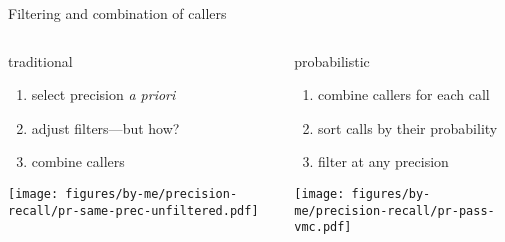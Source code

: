 \documentclass{beamer}
\begin{document}
\begin{frame}{Filtering and combination of callers}
\begin{columns}[b]
\begin{column}{0.5\textwidth}
\begin{center}
{\large traditional}

{\footnotesize
\begin{enumerate}
\item select precision \emph{a priori}
\item adjust filters---\alert{but how?}
\item combine callers
\end{enumerate}
}
\end{center}
\texttt{[image: figures/by-me/precision-recall/pr-same-prec-unfiltered.pdf]}
\end{column}

\begin{column}{0.5\textwidth}
\begin{center}
{\large probabilistic}

{\footnotesize
\begin{enumerate}
\item combine callers for each call
\item sort calls by their probability
\item filter at any precision
\end{enumerate}
}
\end{center}
\texttt{[image: figures/by-me/precision-recall/pr-pass-vmc.pdf]}
\end{column}
\end{columns}
\end{frame}

\end{document}
